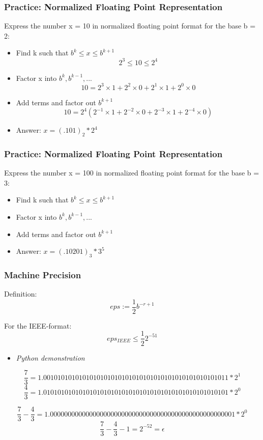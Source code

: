 \documentclass{beamer}
\begin{document}
\begin{frame}
\frametitle{Practice: Normalized Floating Point Representation}

Express the number x = 10 in normalized floating point format for the base b = 2: 
\pause

\begin{itemize}
\item Find k such that $b^k \leq x \leq b^{k+1}$
$$2^3 \leq 10 \leq 2^4$$ \pause
\item Factor x into $b^k, b^{k-1},...$
$$10 = 2^3 \times 1 + 2^2 \times 0 + 2^1 \times 1 + 2^0 \times 0$$ \pause
\item Add terms and factor out $b^{k+1}$
$$10 = 2^4(2^{-1} \times 1 + 2^{-2} \times 0 + 2^{-3} \times 1 + 2^{-4} \times 0)$$ \pause
\item Answer: $x = (.101)_2 * 2^4$

\end{itemize}

\end{frame}

\begin{frame}
\frametitle{Practice: Normalized Floating Point Representation}

Express the number x = 100 in normalized floating point format for the base b = 3: 
\pause

\begin{itemize}
\item Find k such that $b^k \leq x \leq b^{k+1}$
\item Factor x into $b^k, b^{k-1},...$
\item Add terms and factor out $b^{k+1}$ \pause
\item Answer: $x = (.10201)_3 * 3^5$

\end{itemize}

\end{frame}


\begin{frame}
\frametitle{Machine Precision}
Definition:
$$eps := \frac{1}{2}b^{-r+1}$$

For the IEEE-format:
$$eps_{IEEE} \leq \frac{1}{2}2^{-51}$$

\begin{itemize}
\item \textit{Python demonstration}
\end{itemize}
\pause


$$\frac{7}{3} = 1.0010101010101010101010101010101010101010101010101011*2^1$$
 $$\frac{4}{3} = 1.0101010101010101010101010101010101010101010101010101*2^0$$

$$\frac{7}{3} -\frac{4}{3} =  1.0000000000000000000000000000000000000000000000000001*2^0$$
$$\frac{7}{3} -\frac{4}{3} - 1 = 2^{-52} = \epsilon$$



\end{frame}
\end{document}
